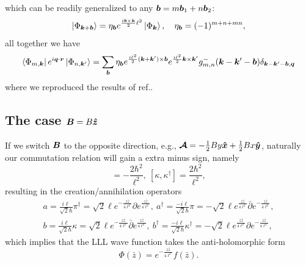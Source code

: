 \documentclass[%
nofootinbib,
 amsmath,amssymb,
 aps,onecolumn,
prb
]{revtex4-2}
\newcommand{\zz}{\bar{z}}
\newcommand{\overpartial}{\bar{\partial}}
\begin{document}
which can be readily generalized to any $\vb*{b}=m\vb*{b}_1+n\vb*{b}_2$:
\begin{equation}
    \ket{\Phi_{\vb*{k}+\vb*{b}}}=\eta_{\vb*{b}}e^{\frac{i\vb*{b}\times\vb*{k}}{2}\ell^2}\ket{\Phi_{\vb*{k}}},\quad \eta_{\vb*{b}}=(-1)^{m+n+mn},
\end{equation}
all together we have 
\begin{equation}
    \bra{\Phi_{m,\vb*{k}}}e^{i\vb*{q}\cdot\vb*{r}}\ket{\Phi_{n,\vb*{k}^\prime}}=\sum_{\vb*{b}}
    \eta_{\vb*{b}}e^{\frac{i\ell^2}{2}(\vb*{k}+\vb*{k}^\prime)\times\vb*{b}}e^{\frac{i\ell^2}{2}\vb*{k}\times\vb*{k}^\prime}g^-_{m,n}(\vb*{k}-\vb*{k}^\prime-\vb*{b})
    \delta_{\vb*{k}-\vb*{k}^\prime-\vb*{b},\vb*{q}}
\end{equation}
where we reproduced the results of ref.\cite{2021JieWangPRL,liu2024theory,dong2022dirac}.

\subsection{The case $\vb*{B}=B\vu*{z}$}
If we switch $\vb*{B}$ to the opposite direction, e.g., $\vb*{\mathcal{A}}=-\frac{1}{2}By\vu*{x}+\frac{1}{2}Bx\vu*{y}$, naturally our commutation relation will gain a extra minus sign, namely
\begin{equation}
    [\pi,\pi^\dag]=-\frac{2\hbar^2}{\ell^2},\ [\kappa,\kappa^\dag]=\frac{2\hbar^2}{\ell^2},
\end{equation}
resulting in the creation/annihilation operators 
\begin{align}
    a=\frac{i\ell}{\sqrt{2}\hbar}\pi^\dag=\sqrt{2}\ell e^{-\frac{z\zz}{4\ell^2}}\partial e^{\frac{z\zz}{4\ell^2}},\ 
    a^\dag=\frac{-i\ell}{\sqrt{2}\hbar}\pi=-\sqrt{2}\ell e^{\frac{z\zz}{4\ell^2}}\overpartial e^{-\frac{z\zz}{4\ell^2}},\nonumber\\ 
    b=\frac{i\ell}{\sqrt{2}\hbar}\kappa=\sqrt{2}\ell e^{-\frac{z\zz}{4\ell^2}}\overpartial e^{\frac{z\zz}{4\ell^2}},\
    b^\dag=\frac{-i\ell}{\sqrt{2}\hbar}\kappa^\dag=-\sqrt{2}\ell e^{\frac{z\zz}{4\ell^2}}\partial e^{-\frac{z\zz}{4\ell^2}},
\end{align}
which implies that the LLL wave function takes the anti-holomorphic form 
\begin{equation}
    \Phi\left(\zz\right)=e^{-\frac{z\zz}{4\ell^2}}f\left(\zz\right).
\end{equation}
\end{document}

